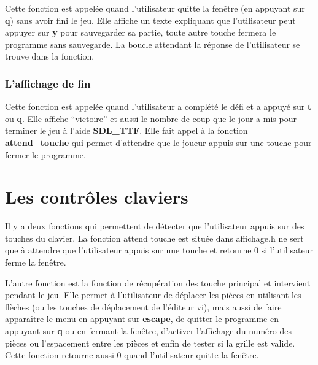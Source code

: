 \documentclass[a4paper]{article}
\begin{document}
Cette fonction est appelée quand l'utilisateur quitte la fenêtre (en appuyant sur
\textbf{q}) sans avoir fini le jeu. Elle affiche un texte expliquant que
l'utilisateur peut appuyer sur \textbf{y} pour sauvegarder sa partie, toute
autre touche fermera le programme sans sauvegarde. La boucle attendant la
réponse de l'utilisateur se trouve dans la fonction.

\subsubsection{L'affichage de fin}

Cette fonction est appelée quand l'utilisateur a complété le défi et a appuyé
sur \textbf{t} ou \textbf{q}. Elle affiche ``victoire'' et aussi le nombre de
coup que le jour a mis pour terminer le jeu à l'aide \textbf{SDL\_TTF}. Elle fait
appel à la fonction \textbf{attend\_touche} qui permet d'attendre que le joueur
appuis sur une touche pour fermer le programme.

\section{Les contrôles claviers}

Il y a deux fonctions qui permettent de détecter que l'utilisateur appuis sur
des touches du clavier. La fonction attend touche est située dans affichage.h ne
sert que à attendre que l'utilisateur appuis sur une touche et retourne 0 si
l'utilisateur ferme la fenêtre.

L'autre fonction est la fonction de récupération
des touche principal et intervient pendant le jeu. Elle permet à l'utilisateur
de déplacer les pièces en utilisant les flèches (ou les touches de déplacement
de l'éditeur vi), mais aussi de faire apparaître le menu en appuyant sur \textbf{escape},
de quitter le programme en appuyant sur \textbf{q} ou en fermant la fenêtre,
d'activer l'affichage du numéro des pièces ou l'espacement entre les pièces et
enfin de tester si la grille est valide. Cette fonction retourne aussi 0 quand
l'utilisateur quitte la fenêtre.
\end{document}
